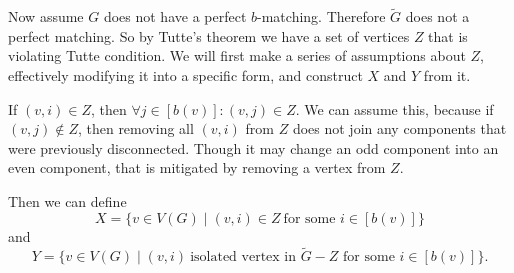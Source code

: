 \begin{exercise}{3}
    Now assume $G$ does not have a perfect $b$-matching. Therefore $\tilde{G}$
    does not a perfect matching. So by Tutte's theorem we have a set of vertices
    $Z$ that is violating Tutte condition. We will first make a series of
    assumptions about $Z$, effectively modifying it into a specific form, and
    construct $X$ and $Y$ from it.

    If $(v, i) \in Z$, then $\forall j \in [b(v)] \colon (v, j) \in Z$. We can
    assume this, because if $(v, j) \notin Z$, then removing all $(v, i)$ from
    $Z$ does not join any components that were previously disconnected. Though
    it may change an odd component into an even component, that is mitigated by
    removing a vertex from $Z$.


    Then we can define
    \begin{equation*}
        X = \{ v \in V(G) \mid (v, i) \in Z\ \text{for some $i \in [b(v)]$} \}
    \end{equation*}
    and
    \begin{equation*}
        Y = \{ v \in V(G) \mid (v, i)\ \text{isolated vertex in $\tilde{G} -
        Z$ for some $i \in [b(v)]$} \}.
    \end{equation*}
    

\end{exercise}
